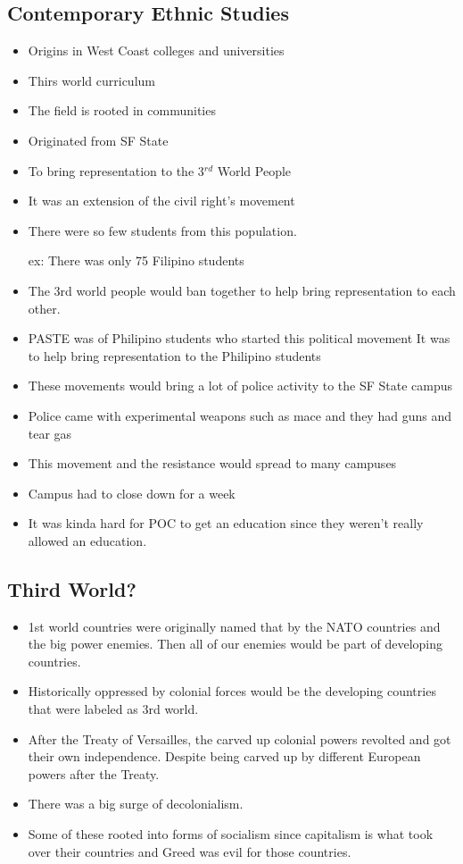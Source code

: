 \documentclass{article}
\begin{document}
\subsection{Contemporary Ethnic Studies}
\begin{itemize}
  \item Origins in West Coast colleges and universities
  \item Thirs world curriculum
  \item The field is rooted in communities
  \item Originated from SF State
  \item To bring representation to the 3$^{rd}$ World People
  \item It was an extension of the civil right's movement
  \item There were so few students from this population. 

    ex: There was only 75 Filipino students
  \item The 3rd world people would ban together
    to help bring representation to each other.
  \item PASTE was of Philipino students who started this political movement
    It was to help bring representation to the Philipino students
  \item These movements would bring a lot of police activity to the SF State campus 
  \item Police came with experimental weapons such as mace and they had guns and tear gas
  \item This movement and the resistance would spread to many campuses
  \item Campus had to close down for a week
  \item It was kinda hard for POC to get an education
    since they weren't really allowed an education.
\end{itemize}

\subsection{Third World?}
\begin{itemize}
  \item 1st world countries were originally named that by the NATO
    countries and the big power enemies.
    Then all of our enemies would be part of developing countries.
  \item Historically oppressed by colonial forces would be the developing countries
    that were labeled as 3rd world.
  \item After the Treaty of Versailles, the carved up colonial powers revolted
    and got their own independence. Despite being carved up by different European
    powers after the Treaty.
  \item There was a big surge of decolonialism.
  \item Some of these rooted into forms of socialism since capitalism
    is what took over their countries and Greed was evil for those countries.
\end{itemize}
\end{document}
